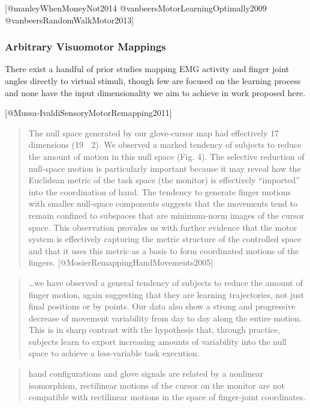 \documentclass[../main.tex]{subfiles}
\begin{document}
{[}@manleyWhenMoneyNot2014 @vanbeersMotorLearningOptimally2009
@vanbeersRandomWalkMotor2013{]}

\subsubsection{Arbitrary Visuomotor Mappings}\label{arbitrary-visuomotor-mappings}

There exist a handful of prior studies mapping EMG activity and finger joint angles directly to virtual stimuli, though few are focused on the learning process and none have the input dimensionality we aim to achieve in work proposed here.

{[}@Mussa-IvaldiSensoryMotorRemapping2011{]}

\begin{quote} The null space generated by our glove-cursor map had effectively 17 dimensions (19 􏰇 2). We observed a marked tendency of subjects to reduce the amount of motion in this null space (Fig. 4). The selective reduction of null-space motion is particularly important because it may reveal how the Euclidean metric of the task space (the monitor) is effectively ``imported'' into the coordination of hand. The tendency to generate finger motions with smaller null-space components suggests that the movements tend to remain confined to subspaces that are minimum-norm images of the cursor space. This observation provides us with further evidence that the motor system is effectively capturing the metric structure of the controlled space and that it uses this metric as a basis to form coordinated motions of the fingers. {[}@MosierRemappingHandMovements2005{]}
\end{quote}

\begin{quote}
\ldots we have observed a general tendency of subjects to reduce the amount of finger motion, again suggesting that they are learning trajectories, not just final positions or by points. Our data also show a strong and progressive decrease of movement variability from day to day along the entire motion. This is in sharp contrast with the hypothesis that, through practice, subjects learn to export increasing amounts of variability into the null space to achieve a less-variable task execution.
\end{quote}

\begin{quote}
hand configurations and glove signals are related by a nonlinear isomorphism, rectilinear motions of the cursor on the monitor are not compatible with rectilinear motions in the space of finger-joint coordinates.
\end{quote}
\end{document}
